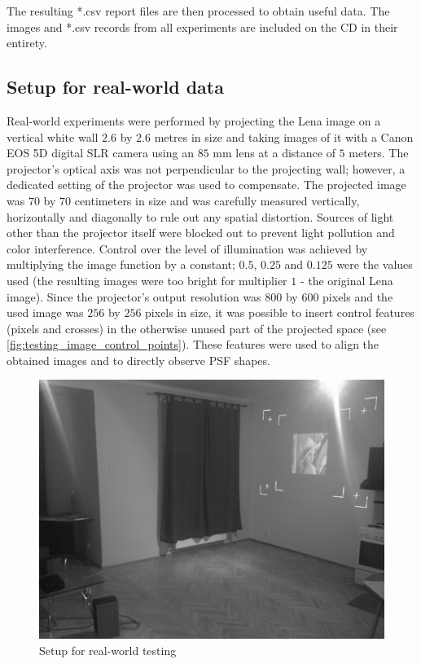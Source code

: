 \documentclass[12pt,notitlepage]{report}
\begin{document}
The resulting *.csv report files are then processed to obtain useful data. The images and *.csv records from all experiments are included on the CD in their entirety.

\subsection{Setup for real-world data}
\label{sec:setup_for_real_world_data}

Real-world experiments were performed by projecting the Lena image on a vertical white wall $2.6$ by $2.6$ metres in size and taking images of it with a Canon EOS 5D digital SLR camera using an $85$ mm lens at a distance of $5$ meters. The projector's optical axis was not perpendicular to the projecting wall; however, a dedicated setting of the projector was used to compensate. The projected image was $70$ by $70$ centimeters in size and was carefully measured vertically, horizontally and diagonally to rule out any spatial distortion.  Sources of light other than the projector itself were blocked out to prevent light pollution and color interference. Control over the level of illumination was achieved by multiplying the image function by a constant; $0.5$, $0.25$ and $0.125$ were the values used (the resulting images were too bright for multiplier $1$ - the original Lena image). Since the projector's output resolution was $800$ by $600$ pixels and the used image was $256$ by $256$ pixels in size, it was possible to insert control features (pixels and crosses) in the otherwise unused part of the projected space (see \ref{fig:testing_image_control_points}). These features were used to align the obtained images and to directly observe PSF shapes. 
\begin{figure}[htb]
 \begin{center}
  \includegraphics[width=12cm]{testing_setup.png}
 \end{center}
 \caption{Setup for real-world testing}
 \label{fig:testing_setup}
\end{figure}
\end{document}

